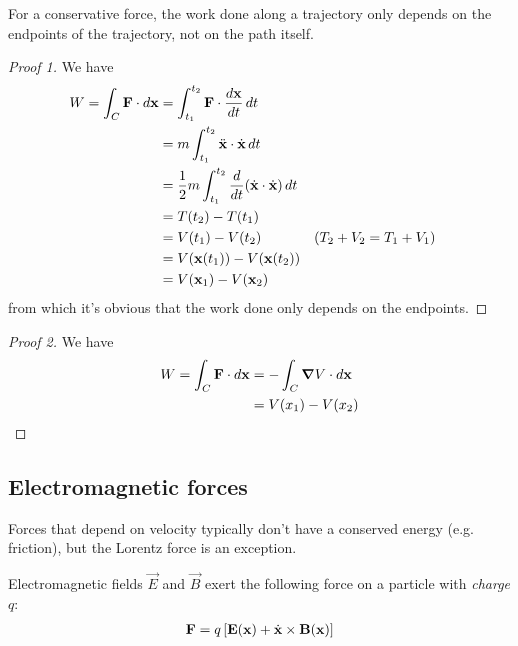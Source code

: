 \documentclass{../../template/note}
\begin{document}
    \begin{proposition}
        For a conservative force, the work done along a trajectory only depends on the endpoints of the trajectory, not on the path itself.
    \end{proposition}
    
    \begin{proof}[Proof 1]
        We have
        \begin{align*}
            W = \int_C \vec F \cdot d \vec x &= \int_{t_1}^{t_2} \vec F \cdot \frac{d \vec x}{dt} \D t \\
            &= m \int_{t_1}^{t_2} \ddot{\vec x} \cdot \dot{\vec x} \D t \\
            &= \frac{1}{2}m \int_{t_1}^{t_2} \frac{d}{dt}(\dot{\vec x} \cdot \dot{\vec x}) \D t \\
            &= T(t_2) - T(t_1) \\
            &= V(t_1) - V(t_2) && (T_2 + V_2 = T_1 + V_1) \\
            &= V(\vec x(t_1)) - V(\vec x(t_2)) \\
            &= V(\vec x_1) - V(\vec x_2)
        \end{align*}
        from which it's obvious that the work done only depends on the endpoints.
    \end{proof}
    
    \begin{proof}[Proof 2]
        We have
        \begin{align*}
            W = \int_C \vec F \cdot d \vec x &= -\int_C \grad V \cdot d \vec x \\
            &= V(x_1) - V(x_2)
        \end{align*}
    \end{proof}
    
    \subsection{Electromagnetic forces}

    Forces that depend on velocity typically don't have a conserved energy (e.g. friction), but the Lorentz force is an exception.

    Electromagnetic fields \(\vec E\) and \(\vec B\) exert the following force on a particle with \emph{charge} \(q\):
    \begin{align*}
        \V F = q\left[\V E(\V x) + \dot{\V x} \times \V B(\V x)\right]
    \end{align*}
    
\end{document}
